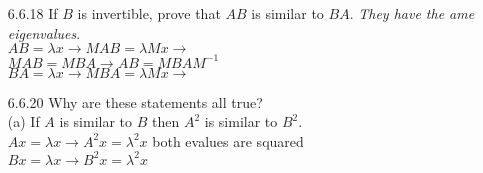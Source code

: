 \documentclass[10pt,twoside,reqno]{article}
\begin{document}
\begin{enumerate}
\vspace{3mm}
(c) $A$ can't be similar to $-A$ unless $A = 0$.\\
False
$
$$
\begin{bmatrix}
0 && 1\\
-1 && 0\\
\end{bmatrix}
$$
$
and
$
$$
\begin{bmatrix}
0 && -1\\
1 && 0\\
\end{bmatrix}
$$
$
are similar with $\lambda = -1, 1$\\
\vspace{3mm}
(d) $A$ can't be similar to $A + I$.\\
True, Adding $I$ increases the evalues by 1\\

\vspace{15mm}
\item[6.6.18] If $B$ is invertible, prove that $AB$ is similar to $BA$. \textit{They have the ame eigenvalues}.\\
$AB = \lambda x \rightarrow MAB = \lambda Mx \rightarrow$\\
\hspace{45mm} $MAB = MBA \rightarrow AB = MBAM^{-1}$\\
$BA = \lambda x \rightarrow MBA = \lambda Mx \rightarrow$\\

\vspace{3mm}
\item[6.6.20] Why are these statements all true?\\
(a) If $A$ is similar to $B$ then $A^2$ is similar to $B^2$.\\
$Ax = \lambda x \rightarrow A^2x = \lambda^2x$ both evalues are squared\\
$Bx = \lambda x \rightarrow B^2x = \lambda^2x$\\


\end{enumerate}
\end{document}
